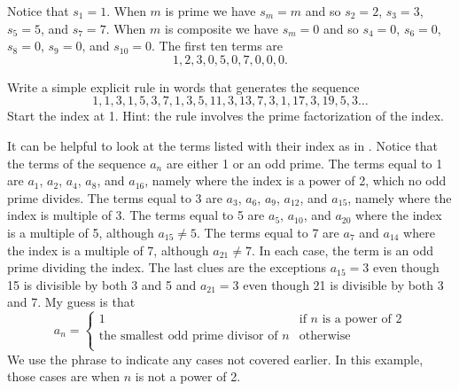 \begin{exam}
\begin{apart}
            \begin{soln}
                Notice that $s_1=1$.  When $m$ is prime we have $s_m=m$ and so $s_2=2$, $s_3=3$, $s_5 = 5$, and $s_7=7$.  When $m$ is composite we have $s_m=0$ and so $s_4=0$, $s_6=0$, $s_8=0$, $s_9=0$, and $s_{10}=0$.  The first ten terms are
                    $$1, 2, 3, 0, 5, 0, 7, 0, 0, 0.$$
            \end{soln}
            
        \item \label{part_seq_prime_smallest_odd_prime_div} Write a simple explicit rule in words that generates the sequence
            $$1, 1, 3, 1, 5, 3, 7, 1, 3, 5, 11, 3, 13, 7, 3, 1, 17, 3, 19, 5, 3 \ldots$$
        Start the index at 1. Hint: the rule involves the prime factorization of the index. 
            \begin{soln}
                It can be helpful to look at the terms listed with their index as in .  Notice that the terms of the sequence $a_n$ are either 1 or an odd prime. The terms equal to 1 are $a_1$, $a_2$, $a_4$, $a_8$, and $a_{16}$, namely where the index is a power of 2, which no odd prime divides. The terms equal to 3 are $a_3$, $a_6$, $a_9$, $a_{12}$, and $a_{15}$, namely where the index is multiple of 3.  The terms equal to 5 are $a_5$, $a_{10}$, and $a_{20}$ where the index is a multiple of 5, although $a_{15} \neq 5$. The terms equal to 7 are $a_7$ and $a_{14}$ where the index is a multiple of 7, although $a_{21} \neq 7$. In each case, the term is an odd prime dividing the index.  The last clues are the exceptions $a_{15}=3$ even though 15 is divisible by both 3 and 5 and $a_{21}=3$ even though 21 is divisible by both 3 and 7.  My guess is that 
                    $$a_n=
                    \left\{ \begin{array} {cc}
                    1 & \text{if } n \text{ is a power of 2} \\
                    \text{the smallest odd prime divisor of }n & \text{otherwise}\\
            \end{array} \right.$$
            We use the phrase  to indicate any cases not covered earlier.  In this example, those cases are when $n$ is not a power of 2.
            \end{soln}


\end{apart}
\end{exam}
